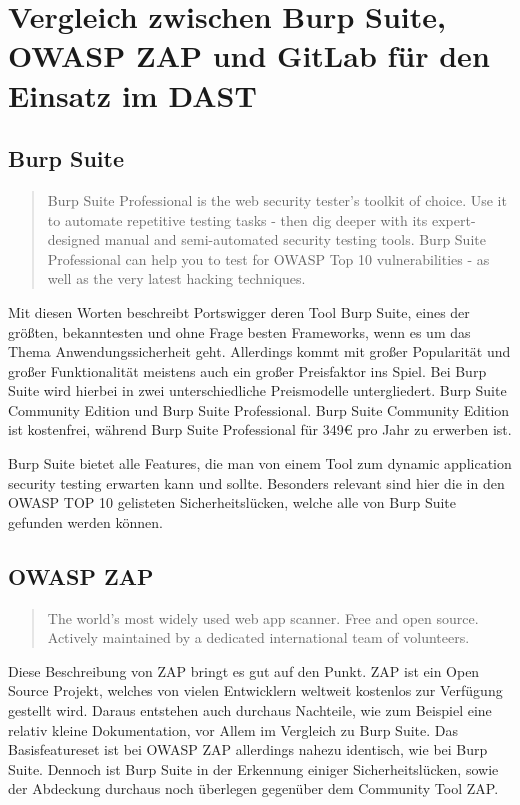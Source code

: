 \newpage
\section{Vergleich zwischen Burp Suite, OWASP ZAP und GitLab für den Einsatz im DAST}\label{sec:vergleich-zwischen-burp-suite-owasp-zap-und-gitlab-für-den-einsatz-im-dast}
\subsection{Burp Suite}

\begin{quote}
    Burp Suite Professional is the web security tester's toolkit of choice.
    Use it to automate repetitive testing tasks - then dig deeper with its expert-designed manual and semi-automated security testing tools.
    Burp Suite Professional can help you to test for OWASP Top 10 vulnerabilities - as well as the very latest hacking techniques.\cite{BurpSuiteProfessional}
\end{quote}

Mit diesen Worten beschreibt Portswigger deren Tool Burp Suite, eines der größten, bekanntesten und ohne Frage besten Frameworks, wenn es um das Thema Anwendungssicherheit geht.
Allerdings kommt mit großer Popularität und großer Funktionalität meistens auch ein großer Preisfaktor ins Spiel.
Bei Burp Suite wird hierbei in zwei unterschiedliche Preismodelle untergliedert.
Burp Suite Community Edition und Burp Suite Professional.
Burp Suite Community Edition ist kostenfrei, während Burp Suite Professional für 349€ pro Jahr zu erwerben ist.

Burp Suite bietet alle Features, die man von einem Tool zum dynamic application security testing erwarten kann und sollte.
Besonders relevant sind hier die in den OWASP TOP 10\cite{OWASPTopTen} gelisteten Sicherheitslücken, welche alle von Burp Suite gefunden werden können.

\subsection{OWASP ZAP}

\begin{quote}
The world’s most widely used web app scanner.
Free and open source.
Actively maintained by a dedicated international team of volunteers.\cite{ZAPHomepage}
\end{quote}

Diese Beschreibung von ZAP bringt es gut auf den Punkt.
ZAP ist ein Open Source Projekt, welches von vielen Entwicklern weltweit kostenlos zur Verfügung gestellt wird.
Daraus entstehen auch durchaus Nachteile, wie zum Beispiel eine relativ kleine Dokumentation, vor Allem im Vergleich zu Burp Suite.
Das Basisfeatureset ist bei OWASP ZAP allerdings nahezu identisch, wie bei Burp Suite.
Dennoch ist Burp Suite in der Erkennung einiger Sicherheitslücken, sowie der Abdeckung durchaus noch überlegen gegenüber dem Community Tool ZAP.\cite{teamBurpSuiteVs2021}

